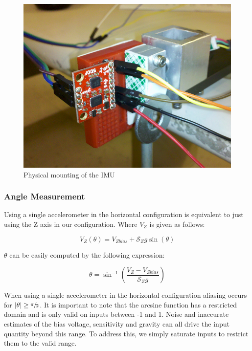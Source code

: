 \documentclass{article}
\theoremstyle{plain}
\theoremstyle{definition}
\theoremstyle{remark}
\newcommand{\Sens}{\mathcal{S}}
\begin{document}
\begin{figure}[hbt]
\begin{center}
\includegraphics[width = 13cm]{SensorMounting.png}
\caption{Physical mounting of the IMU}
\label{sensorMount}
\end{center}
\end{figure}


\subsubsection{Angle Measurement}

Using a single accelerometer in the horizontal configuration is equivalent to just using the Z axis in our configuration.  Where $V_{Z}$ is given as follows: 

$$ V_{Z}(\theta) = V_{Zbias} + \Sens_{Z} g \sin(\theta) $$

$\theta$ can be easily computed by the following expression:

\begin{equation}
\theta = \sin^{-1}\left( \frac{V_{Z} - V_{Zbias}}{\Sens_{Z} g}\right) 
\label{horizontalEQ}
\end{equation}

When using a single accelerometer in the horizontal configuration aliasing occurs for $|\theta| \geq \sfrac{\pi}{2}$.  It is important to note that the arcsine function has a restricted domain and is only valid on inputs between -1 and 1.  Noise and inaccurate estimates of the bias voltage, sensitivity and gravity can all drive the input quantity beyond this range.  To address this, we simply saturate inputs to restrict them to the valid range.
\end{document}
